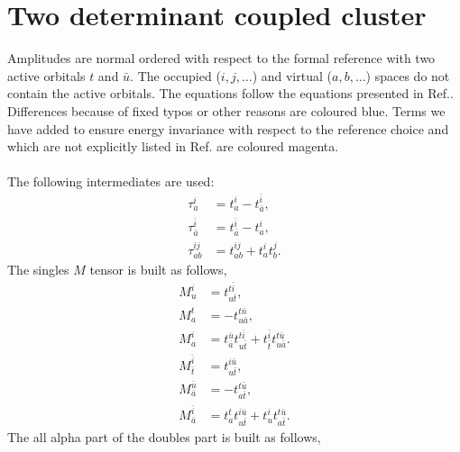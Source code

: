 \documentclass[a4paper,12pt,oneside]{book}
\newcommand{\blue}[1]{{\color{blue} #1}}
\newcommand{\magenta}[1]{{\color{magenta} #1}}
\newcommand{\spa}[1]{{#1}}
\newcommand{\spb}[1]{\bar{#1}}
\begin{document}
\chapter{Two determinant coupled cluster}
Amplitudes are normal ordered with respect to the formal reference with two active orbitals $t$ and $\spb{u}$.
The occupied ($i,j,\ldots$) and virtual ($a,b,\ldots$) spaces do not contain the active orbitals.
The equations follow the equations presented in Ref.\cite{szalay94}.
Differences because of fixed typos or other reasons are coloured \blue{blue}.
Terms we have added to ensure energy invariance with respect to the reference choice 
and which are not explicitly listed in Ref.\cite{szalay94} are coloured \magenta{magenta}. \\ \\
The following intermediates are used:
\begin{align}
\tau^{\spa{i}}_{\spa{a}}             &= t^{\spa{i}}_{\spa{a}} - t^{\spb{i}}_{\spb{a}}, \\
\tau^{\spb{i}}_{\spb{a}} &= t^{\spb{i}}_{\spb{a}} - t^{\spa{i}}_{\spa{a}}, \\
\tau^{\spa{i}\spa{j}}_{\spa{a}\spa{b}}           &= t^{\spa{i}\spa{j}}_{\spa{a}\spa{b}} + t^{\spa{i}}_{\spa{a}} t^{\spa{j}}_{\spa{b}}.
\end{align}
The singles $M$ tensor is built as follows,
\begin{align}
M^{\spa{i}}_{\spa{u}} &= t^{\spa{t}\spb{i}}_{\spa{u}\spb{t}}, \\
M^{\spa{t}}_{\spa{a}} &= -t^{\spa{t}\spb{n}}_{\spa{u}\spb{a}}, \\
M^{\spa{i}}_{\spa{a}} &= t^{\spb{u}}_{\spb{a}} t^{t\spb{i}}_{u\spb{t}} + t^{\spb{i}}_{\spb{t}} t^{t\spb{u}}_{u\spb{a}}.
\end{align}
\begin{align}
M^{\spb{i}}_{\spb{t}} &= t^{\spa{i}\spb{u}}_{\spa{u}\spb{t}}, \\
M^{\spb{u}}_{\spb{a}} &= - t^{\spa{t}\spb{u}}_{\spa{a}\spb{t}}, \\
M^{\spb{i}}_{\bar{a}} &= t^{\spa{t}}_{\spa{a}} t^{\spa{i}\spb{u}}_{u\spb{t}} + t^{\spa{i}}_{\spa{u}} t^{\spa{t}\spb{u}}_{\spa{a}\spb{t}}.
\end{align}
The all alpha part of the doubles part is built as follows,
\end{document}
